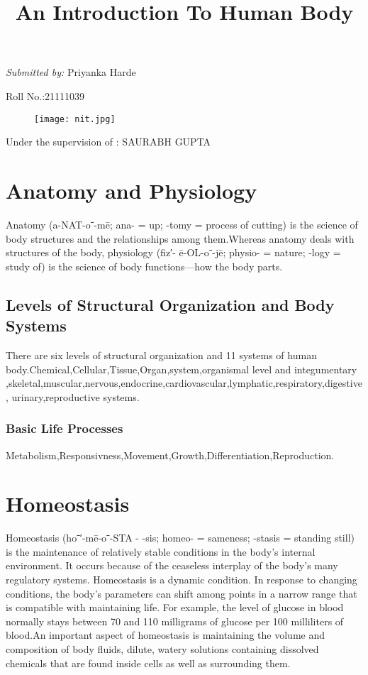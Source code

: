 \documentclass[11pt]{article}
\title{\textbf{An Introduction To Human Body}}
\begin{document}
\maketitle
\centering
\emph{\large Submitted by:}
\large Priyanka Harde

\large Roll No.:21111039
\begin{figure}[h]
\begin{center}
\texttt{[image: nit.jpg]}
\end{center}
\end{figure}

\large Under the supervision of : SAURABH GUPTA 
\clearpage 
\tableofcontents
\clearpage
\section{Anatomy and Physiology}

\raggedright Anatomy (a-NAT-oˉ-mē; ana- = up; -tomy = process of cutting) is the
science of body structures and the relationships among them.Whereas anatomy deals with structures of the body, physiology (fiz′-
ē-OL-oˉ-jē; physio- = nature; -logy = study of) is the science of body
functions—how the body parts. 
\subsection{Levels of Structural
Organization and
Body Systems}

There are six levels of structural organization and 11 systems of human body.Chemical,Cellular,Tissue,Organ,system,organismal level and integumentary ,skeletal,muscular,nervous,endocrine,cardiovascular,lymphatic,respiratory,digestive, 
urinary,reproductive systems.
\subsubsection{Basic Life Processes}

Metabolism,Responsivness,Movement,Growth,Differentiation,Reproduction.
\section{Homeostasis}

Homeostasis (hoˉ′-mē-oˉ-STA - -sis; homeo- = sameness; -stasis = standing
still) is the maintenance of relatively stable conditions in the
body’s internal environment. It occurs because of the ceaseless interplay
of the body’s many regulatory systems. Homeostasis is a dynamic
condition. In response to changing conditions, the body’s parameters
can shift among points in a narrow range that is compatible with
maintaining life. For example, the level of glucose in blood normally
stays between 70 and 110 milligrams of glucose per 100 milliliters of
blood.An important aspect of homeostasis is maintaining the volume and
composition of body fluids, dilute, watery solutions containing dissolved
chemicals that are found inside cells as well as surrounding
them.
\end{document}
